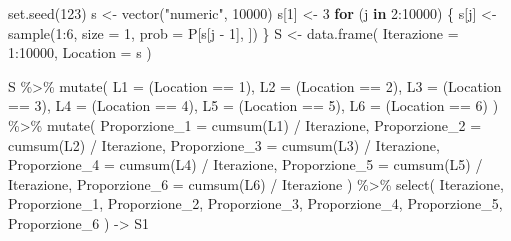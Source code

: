 \documentclass[
  11pt,
]{krantz}
\makeatletter
\newenvironment{Shaded}{\begin{snugshade}}{\end{snugshade}}
\newcommand{\AttributeTok}[1]{\textcolor[rgb]{0.61,0.61,0.61}{#1}}
\newcommand{\ControlFlowTok}[1]{\textcolor[rgb]{0.27,0.27,0.27}{\textbf{#1}}}
\newcommand{\DecValTok}[1]{\textcolor[rgb]{0.06,0.06,0.06}{#1}}
\newcommand{\FunctionTok}[1]{\textcolor[rgb]{0,0,0}{#1}}
\newcommand{\NormalTok}[1]{#1}
\newcommand{\OtherTok}[1]{\textcolor[rgb]{0.37,0.37,0.37}{#1}}
\newcommand{\SpecialCharTok}[1]{\textcolor[rgb]{0,0,0}{#1}}
\newcommand{\StringTok}[1]{\textcolor[rgb]{0.5,0.5,0.5}{#1}}
\newenvironment{kframe}{%
\medskip{}
\setlength{\fboxsep}{.8em}
 \def\at@end@of@kframe{}%
 \ifinner\ifhmode%
  \def\at@end@of@kframe{\end{minipage}}%
  \begin{minipage}{\columnwidth}%
 \fi\fi%
 \def\FrameCommand##1{\hskip\@totalleftmargin \hskip-\fboxsep
 \colorbox{shadecolor}{##1}\hskip-\fboxsep
     \hskip-\linewidth \hskip-\@totalleftmargin \hskip\columnwidth}%
 \MakeFramed {\advance\hsize-\width
   \@totalleftmargin\z@ \linewidth\hsize
   \@setminipage}}%
 {\par\unskip\endMakeFramed%
 \at@end@of@kframe}
\renewenvironment{Shaded}{\begin{kframe}}{\end{kframe}}
\theoremstyle{definition}
\theoremstyle{definition}
\theoremstyle{definition}
\theoremstyle{definition}
\theoremstyle{remark}
\makeatother
\begin{document}
\begin{Shaded}
\begin{Highlighting}[]
\FunctionTok{set.seed}\NormalTok{(}\DecValTok{123}\NormalTok{)}
\NormalTok{s }\OtherTok{\textless{}{-}} \FunctionTok{vector}\NormalTok{(}\StringTok{"numeric"}\NormalTok{, }\DecValTok{10000}\NormalTok{)}
\NormalTok{s[}\DecValTok{1}\NormalTok{] }\OtherTok{\textless{}{-}} \DecValTok{3}
\ControlFlowTok{for}\NormalTok{ (j }\ControlFlowTok{in} \DecValTok{2}\SpecialCharTok{:}\DecValTok{10000}\NormalTok{) \{}
\NormalTok{  s[j] }\OtherTok{\textless{}{-}} \FunctionTok{sample}\NormalTok{(}\DecValTok{1}\SpecialCharTok{:}\DecValTok{6}\NormalTok{, }\AttributeTok{size =} \DecValTok{1}\NormalTok{, }\AttributeTok{prob =}\NormalTok{ P[s[j }\SpecialCharTok{{-}} \DecValTok{1}\NormalTok{], ])}
\NormalTok{\}}
\NormalTok{S }\OtherTok{\textless{}{-}} \FunctionTok{data.frame}\NormalTok{(}
  \AttributeTok{Iterazione =} \DecValTok{1}\SpecialCharTok{:}\DecValTok{10000}\NormalTok{,}
  \AttributeTok{Location =}\NormalTok{ s}
\NormalTok{)}

\NormalTok{S }\SpecialCharTok{\%\textgreater{}\%}
  \FunctionTok{mutate}\NormalTok{(}
    \AttributeTok{L1 =}\NormalTok{ (Location }\SpecialCharTok{==} \DecValTok{1}\NormalTok{),}
    \AttributeTok{L2 =}\NormalTok{ (Location }\SpecialCharTok{==} \DecValTok{2}\NormalTok{),}
    \AttributeTok{L3 =}\NormalTok{ (Location }\SpecialCharTok{==} \DecValTok{3}\NormalTok{),}
    \AttributeTok{L4 =}\NormalTok{ (Location }\SpecialCharTok{==} \DecValTok{4}\NormalTok{),}
    \AttributeTok{L5 =}\NormalTok{ (Location }\SpecialCharTok{==} \DecValTok{5}\NormalTok{),}
    \AttributeTok{L6 =}\NormalTok{ (Location }\SpecialCharTok{==} \DecValTok{6}\NormalTok{)}
\NormalTok{  ) }\SpecialCharTok{\%\textgreater{}\%}
  \FunctionTok{mutate}\NormalTok{(}
    \AttributeTok{Proporzione\_1 =} \FunctionTok{cumsum}\NormalTok{(L1) }\SpecialCharTok{/}\NormalTok{ Iterazione,}
    \AttributeTok{Proporzione\_2 =} \FunctionTok{cumsum}\NormalTok{(L2) }\SpecialCharTok{/}\NormalTok{ Iterazione,}
    \AttributeTok{Proporzione\_3 =} \FunctionTok{cumsum}\NormalTok{(L3) }\SpecialCharTok{/}\NormalTok{ Iterazione,}
    \AttributeTok{Proporzione\_4 =} \FunctionTok{cumsum}\NormalTok{(L4) }\SpecialCharTok{/}\NormalTok{ Iterazione,}
    \AttributeTok{Proporzione\_5 =} \FunctionTok{cumsum}\NormalTok{(L5) }\SpecialCharTok{/}\NormalTok{ Iterazione,}
    \AttributeTok{Proporzione\_6 =} \FunctionTok{cumsum}\NormalTok{(L6) }\SpecialCharTok{/}\NormalTok{ Iterazione}
\NormalTok{  ) }\SpecialCharTok{\%\textgreater{}\%}
  \FunctionTok{select}\NormalTok{(}
\NormalTok{    Iterazione, Proporzione\_1, Proporzione\_2, Proporzione\_3,}
\NormalTok{    Proporzione\_4, Proporzione\_5, Proporzione\_6}
\NormalTok{  ) }\OtherTok{{-}\textgreater{}}\NormalTok{ S1}


\end{Highlighting}
\end{Shaded}
\end{document}
